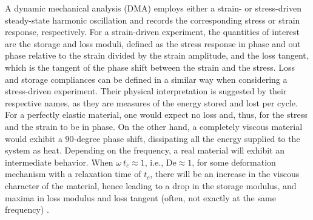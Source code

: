 A dynamic mechanical analysis (DMA) employs either a strain- or stress-driven steady-state harmonic oscillation and records the corresponding stress or strain response, respectively.
For a strain-driven experiment, the quantities of interest are the storage and loss moduli, defined as the stress response in phase and out phase relative to the strain divided by the strain amplitude, and the loss tangent, which is the tangent of the phase shift between the strain and the stress.
Loss and storage compliances can be defined in a similar way when considering a stress-driven experiment.
Their physical interpretation is suggested by their respective names, as they are measures of the energy stored and lost per cycle.
For a perfectly elastic material, one would expect no loss and, thus, for the stress and the strain to be in phase.
On the other hand, a completely viscous material would exhibit a 90-degree phase shift, dissipating all the energy supplied to the system as heat.
Depending on the frequency, a real material will exhibit an intermediate behavior.
When $\omega\ t_c \approx 1$, i.e., $\mathrm{De} \approx 1$, for some deformation mechanism with a relaxation time of $t_c$, there will be an increase in the viscous character of the material, hence leading to a drop in  the storage modulus, and maxima in loss modulus and loss tangent (often, not exactly at the same frequency) \citep{ferryViscoelasticPropertiesPolymers1980}.

